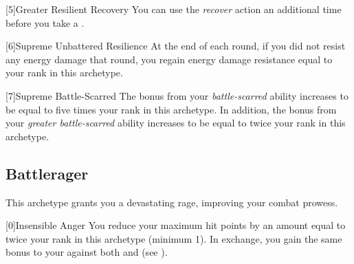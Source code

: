         [5]{Greater Resilient Recovery} You can use the \textit{recover} action an additional time before you take a .

        [6]{Supreme Unbattered Resilience} At the end of each round, if you did not resist any energy damage that round, you regain energy damage resistance equal to your rank in this archetype.

        [7]{Supreme Battle-Scarred} The bonus from your \textit{battle-scarred} ability increases to be equal to five times your rank in this archetype.
        In addition, the bonus from your \textit{greater battle-scarred} ability increases to be equal to twice your rank in this archetype.

    \newpage
    \subsection{Battlerager}\label{Rage}
        This archetype grants you a devastating rage, improving your combat prowess.

        [0]{Insensible Anger} You reduce your maximum hit points by an amount equal to twice your rank in this archetype (minimum 1).
        In exchange, you gain the same bonus to your  against both  and  (see ).

